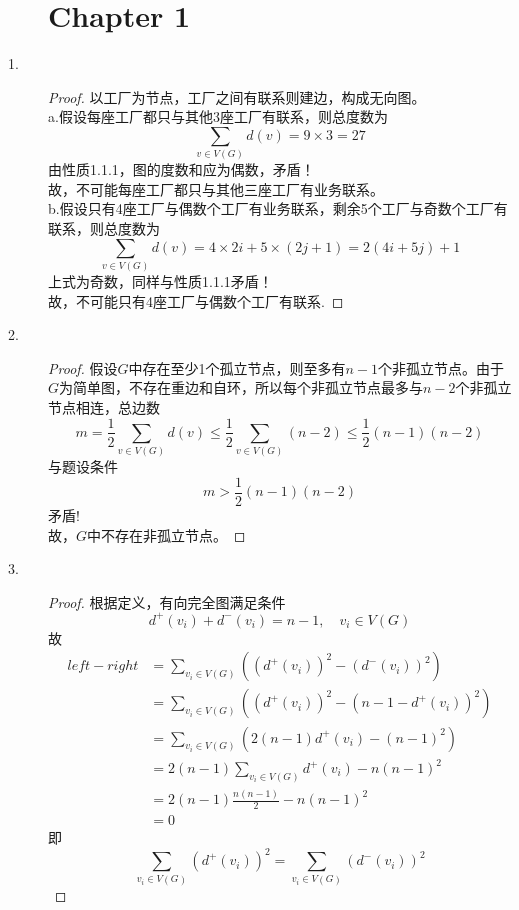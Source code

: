 \documentclass[UTF8, onecolumn, a4paper]{article}
\begin{document}
\begin{description}
\section*{Chapter 1}
\item[1.] 
\begin{proof}
以工厂为节点，工厂之间有联系则建边，构成无向图。\\
a.假设每座工厂都只与其他3座工厂有联系，则总度数为
$$\underset{v\in V(G)}{\sum}d(v) = 9 \times 3 = 27$$
由性质1.1.1，图的度数和应为偶数，矛盾！\\
故，不可能每座工厂都只与其他三座工厂有业务联系。\\
b.假设只有4座工厂与偶数个工厂有业务联系，剩余5个工厂与奇数个工厂有联系，则总度数为
$$\underset{v\in V(G)}{\sum}d(v) = 4 \times 2i + 5 \times(2j+1) = 2(4i+5j)+1$$
上式为奇数，同样与性质1.1.1矛盾！\\
故，不可能只有4座工厂与偶数个工厂有联系.
\end{proof}
\item[2.] 
\begin{proof}
	假设$G$中存在至少1个孤立节点，则至多有$n-1$个非孤立节点。由于$G$为简单图，不存在重边和自环，所以每个非孤立节点最多与$n-2$个非孤立节点相连，总边数
	$$m = \frac{1}{2}\underset{v\in V(G)}{\sum}d(v) \leq \frac{1}{2}\underset{v\in V(G)}{\sum}(n-2) \leq \frac{1}{2}(n-1)(n-2)$$
	与题设条件$$m > \frac{1}{2}(n-1)(n-2)$$矛盾!\\
	故，$G$中不存在非孤立节点。
\end{proof}
\item[3.]
\begin{proof}
根据定义，有向完全图满足条件
$$d^+(v_i)+d^-(v_i) = n-1,\quad v_i\in V(G)$$
故
\begin{equation}
\begin{aligned}
left - right &=
\underset{v_i\in V(G)}{\sum}\left((d^+(v_i))^2 - (d^-(v_i))^2\right)\\ &= 
\underset{v_i\in V(G)}{\sum}\left((d^+(v_i))^2 - (n-1-d^+(v_i))^2\right)\\
&=\underset{v_i\in V(G)}{\sum}\left(2(n-1)d^+(v_i) - (n-1)^2\right)\\
&=2(n-1)\underset{v_i\in V(G)}{\sum}d^+(v_i) - n(n-1)^2\\
&=2(n-1)\frac{n(n-1)}{2} - n(n-1)^2\\
&=0
\end{aligned}
\end{equation}
即
$$\underset{v_i\in V(G)}{\sum}(d^+(v_i))^2 = \underset{v_i\in V(G)}{\sum}(d^-(v_i))^2$$
\end{proof}


\end{description}
\end{document}
